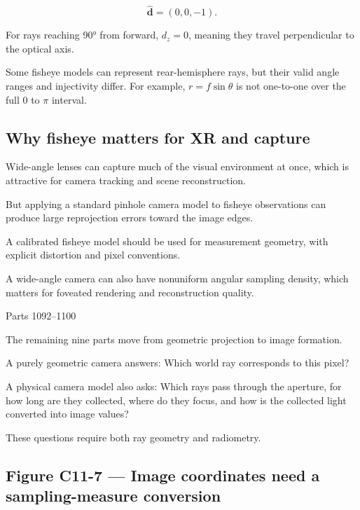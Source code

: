 \[ \hat{\mathbf d}=(0,0,-1). \]

For rays reaching 90° from forward, \(d_z=0\), meaning they travel perpendicular to the optical axis.

Some fisheye models can represent rear-hemisphere rays, but their valid angle ranges and injectivity differ. For example, \(r=f\sin\theta\) is not one-to-one over the full \(0\) to \(\pi\) interval.

\subsection{Why fisheye matters for XR and capture}\label{02-foundations-ii-ch035-why-fisheye-matters-for-xr-and-capture}

\hypertarget{02-foundations-ii-ch035-why-fisheye-matters-for-xr-and-capture}{}

Wide-angle lenses can capture much of the visual environment at once, which is attractive for camera tracking and scene reconstruction.

But applying a standard pinhole camera model to fisheye observations can produce large reprojection errors toward the image edges.

A calibrated fisheye model should be used for measurement geometry, with explicit distortion and pixel conventions.

A wide-angle camera can also have nonuniform angular sampling density, which matters for foveated rendering and reconstruction quality.

Parts 1092--1100

The remaining nine parts move from geometric projection to image formation.

A purely geometric camera answers: Which world ray corresponds to this pixel?

A physical camera model also asks: Which rays pass through the aperture, for how long are they collected, where do they focus, and how is the collected light converted into image values?

These questions require both ray geometry and radiometry.

\subsection{Figure C11-7 --- Image coordinates need a sampling-measure conversion}\label{02-foundations-ii-ch035-figure-c11-7-image-coordinates-need-a-sampling-measure-conversion}

\hypertarget{02-foundations-ii-ch035-figure-c11-7-image-coordinates-need-a-sampling-measure-conversion}{}

